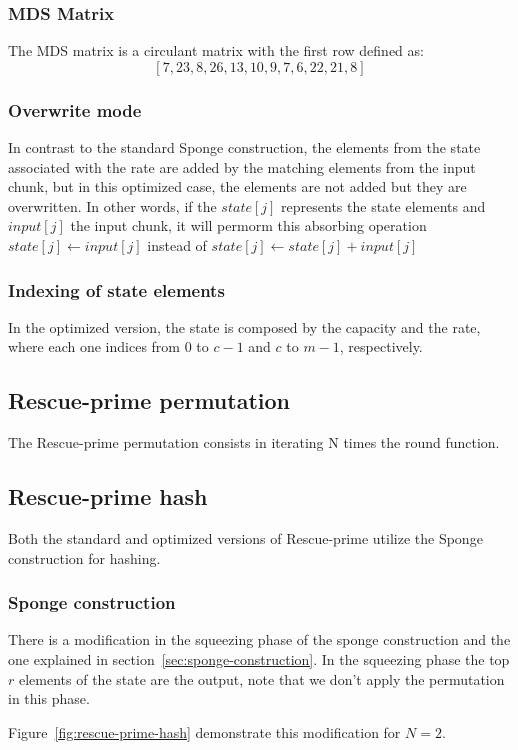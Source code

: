   \subsubsection*{MDS Matrix}
The MDS matrix is a circulant matrix with the first row defined as:
\[[7,23,8,26,13,10,9,7,6,22,21,8]\]

\subsubsection*{Overwrite mode}
In contrast to the standard Sponge construction, the elements from the state associated with the rate are added by the matching elements from the input chunk, but in this optimized case, the elements are not added but they are overwritten. In other words, if the $state[j]$ represents the state elements and $input[j]$ the input chunk, it will permorm this absorbing operation $state[j] \leftarrow input[j]$ instead of $state[j] \leftarrow state[j] + input[j]$ 

\subsubsection*{Indexing of state elements}
In the optimized version, the state is composed by the capacity and the rate, where each one indices from 0 to $c - 1$ and $c$ to $m - 1$, respectively.

\subsection*{Rescue-prime permutation}
The Rescue-prime permutation consists in iterating N times the round function.

\subsection*{Rescue-prime hash}
Both the standard and optimized versions of Rescue-prime utilize the Sponge construction for hashing.

\subsubsection*{Sponge construction}
There is a modification in the squeezing phase of the sponge construction and the one explained in section~\ref{sec:sponge-construction}. In the squeezing phase the top $r$ elements of the state are the output, note that we don't apply the permutation in this phase.

Figure~\ref{fig:rescue-prime-hash} demonstrate this modification for $N=2$.

